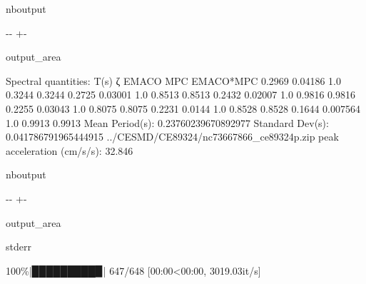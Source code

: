 \documentclass[letterpaper,10pt,english]{sphinxmanual}
\begin{document}
\begin{sphinxuseclass}{nboutput}
{

\kern-\sphinxverbatimsmallskipamount\kern-\baselineskip
\kern+\FrameHeightAdjust\kern-\fboxrule
\vspace{\nbsphinxcodecellspacing}

\begin{sphinxuseclass}{output_area}
\begin{sphinxuseclass}{}


\begin{sphinxVerbatim}[commandchars=\\\{\}]
Spectral quantities:
       T(s)        ζ        EMACO        MPC     EMACO*MPC
      0.2969     0.04186    1.0        0.3244     0.3244
      0.2725     0.03001    1.0        0.8513     0.8513
      0.2432     0.02007    1.0        0.9816     0.9816
      0.2255     0.03043    1.0        0.8075     0.8075
      0.2231     0.0144     1.0        0.8528     0.8528
      0.1644     0.007564   1.0        0.9913     0.9913
Mean Period(s): 0.23760239670892977
Standard Dev(s): 0.041786791965444915
../CESMD/CE89324/nc73667866\_ce89324p.zip
peak acceleration (cm/s/s): 32.846
\end{sphinxVerbatim}



\end{sphinxuseclass}
\end{sphinxuseclass}
}

\end{sphinxuseclass}
\begin{sphinxuseclass}{nboutput}
{

\kern-\sphinxverbatimsmallskipamount\kern-\baselineskip
\kern+\FrameHeightAdjust\kern-\fboxrule
\vspace{\nbsphinxcodecellspacing}

\begin{sphinxuseclass}{output_area}
\begin{sphinxuseclass}{stderr}


\begin{sphinxVerbatim}[commandchars=\\\{\}]
100\%|█████████▉| 647/648 [00:00<00:00, 3019.03it/s]
\end{sphinxVerbatim}



\end{sphinxuseclass}
\end{sphinxuseclass}
}

\end{sphinxuseclass}
\end{document}
